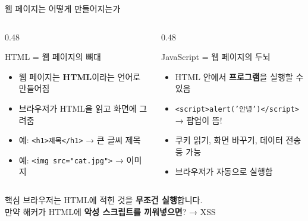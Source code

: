 \documentclass[aspectratio=169,10pt]{beamer}
\newcommand{\hlt}[1]{\textcolor{accent}{\textbf{#1}}}
\begin{document}
\begin{frame}{웹 페이지는 어떻게 만들어지는가}

\begin{columns}[T]
\begin{column}{0.48\textwidth}
\begin{block}{HTML = 웹 페이지의 뼈대}
\begin{itemize}
    \item 웹 페이지는 \textbf{HTML}이라는 언어로 만들어짐
    \item 브라우저가 HTML을 읽고 화면에 그려줌
    \item 예: \texttt{<h1>제목</h1>} → 큰 글씨 제목
    \item 예: \texttt{<img src="cat.jpg">} → 이미지
\end{itemize}
\end{block}
\end{column}
\begin{column}{0.48\textwidth}
\begin{block}{JavaScript = 웹 페이지의 두뇌}
\begin{itemize}
    \item HTML 안에서 \textbf{프로그램}을 실행할 수 있음
    \item \texttt{<script>alert('안녕')</script>}\\
          → 팝업이 뜸!
    \item 쿠키 읽기, 화면 바꾸기, 데이터 전송 등 가능
    \item 브라우저가 자동으로 실행함
\end{itemize}
\end{block}
\end{column}
\end{columns}

\vspace{0.5em}
\begin{alertblock}{핵심}
브라우저는 HTML에 적힌 것을 \hlt{무조건 실행}합니다.\\
만약 해커가 HTML에 \hlt{악성 스크립트를 끼워넣으면}? → XSS
\end{alertblock}
\end{frame}
\end{document}
